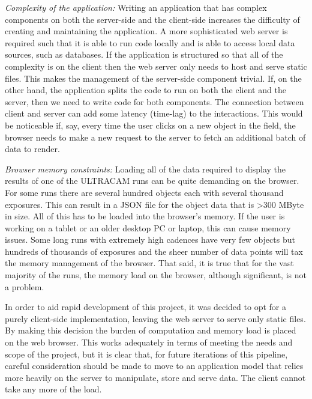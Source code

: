 \emph{Complexity of the application:} Writing an application that has complex components on both the server-side and the client-side increases the difficulty of creating and maintaining the application. A more sophisticated web server is required such that it is able to run code locally and is able to access local data sources, such as databases. If the application is structured so that all of the complexity is on the client then the web server only needs to host and serve static files. This makes the management of the server-side component trivial. If, on the other hand, the application splits the code to run on both the client and the server, then we need to write code for both components. The connection between client and server can add some latency (time-lag) to the interactions. This would be noticeable if, say, every time the user clicks on a new object in the field, the browser needs to make a new request to the server to fetch an additional batch of data to render.  

\emph{Browser memory constraints:} Loading all of the data required to display the results of one of the ULTRACAM runs can be quite demanding on the browser. For some runs there are several hundred objects each with several thousand exposures. This can result in a JSON file for the object data that is \textgreater 300 MByte in size. All of this has to be loaded into the browser's memory. If the user is working on a tablet or an older desktop PC or laptop, this can cause memory issues. Some long runs with extremely high cadences have very few objects but hundreds of thousands of exposures and the sheer number of data points will tax the memory management of the browser. That said, it is true that for the vast majority of the runs, the memory load on the browser, although significant, is not a problem. 

In order to aid rapid development of this project, it was decided to opt for a purely client-side implementation, leaving the web server to serve only static files. By making this decision the burden of computation and memory load is placed on the web browser. This works adequately in terms of meeting the needs and scope of the project, but it is clear that, for future iterations of this pipeline, careful consideration should be made to move to an application model that relies more heavily on the server to manipulate, store and serve data. The client cannot take any more of the load. 

